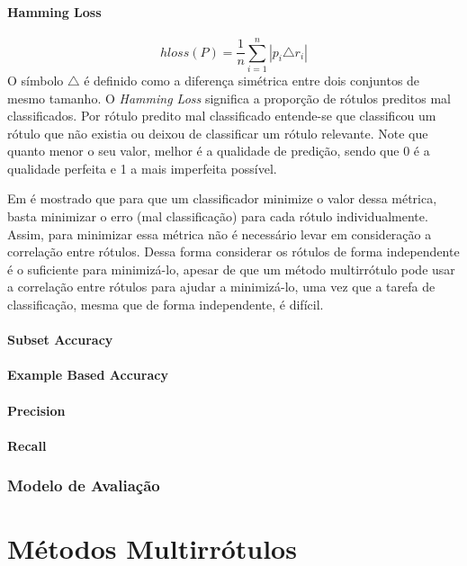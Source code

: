 \subsubsection{Hamming Loss}
\begin{equation}
 hloss(P)=\frac{1}{n} \sum_{i=1}^n{|p_i \triangle r_i|}
\end{equation}
O símbolo $\triangle$ é definido como a diferença simétrica entre dois conjuntos de mesmo tamanho.
O \textit{Hamming Loss} significa a proporção de rótulos preditos mal classificados. Por rótulo predito mal classificado
entende-se que classificou um rótulo que não existia ou deixou de classificar um rótulo relevante.
Note que quanto menor o seu valor, melhor é a qualidade de predição, sendo que 0 é a qualidade perfeita e 1 a mais
imperfeita possível.

Em \cite{pcc2010} é mostrado que para que um classificador minimize o valor dessa métrica, basta minimizar
o erro (mal classificação) para cada rótulo individualmente. 
Assim, para minimizar essa métrica não é necessário levar
em consideração a correlação entre rótulos. Dessa forma considerar os rótulos de forma independente é o suficiente para minimizá-lo,
apesar de que um método multirrótulo pode usar a correlação entre rótulos para ajudar a minimizá-lo, uma vez que 
a tarefa de classificação, mesma que de forma independente, é difícil.

\subsubsection{Subset Accuracy}
\subsubsection{Example Based Accuracy}
\subsubsection{Precision}
\subsubsection{Recall}
\subsection{Modelo de Avaliação}
\label{sec:modelav}

\chapter{Métodos Multirrótulos}
